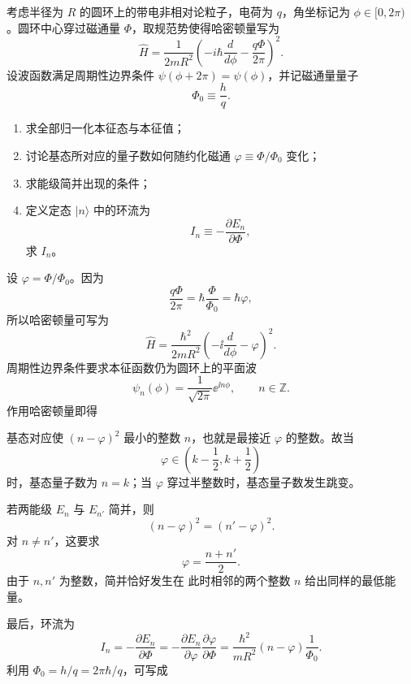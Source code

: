 ﻿

\begin{question}
考虑半径为 $R$ 的圆环上的带电非相对论粒子，电荷为 $q$，角坐标记为 $\phi\in[0,2\pi)$。圆环中心穿过磁通量 $\Phi$，取规范势使得哈密顿量写为
\[
\hat H=\frac{1}{2mR^2}\left(-i\hbar\frac{d}{d\phi}-\frac{q\Phi}{2\pi}\right)^2.
\]
设波函数满足周期性边界条件 $\psi(\phi+2\pi)=\psi(\phi)$，并记磁通量量子
\[
\Phi_0\equiv \frac{h}{q}.
\]

\begin{enumerate}[label=(\arabic*),leftmargin=2.5em]
  \item 求全部归一化本征态与本征值；
  \item 讨论基态所对应的量子数如何随约化磁通 $\varphi\equiv \Phi/\Phi_0$ 变化；
  \item 求能级简并出现的条件；
  \item 定义定态 $|n\rangle$ 中的环流为
  \[
  I_n\equiv -\frac{\partial E_n}{\partial \Phi},
  \]
  求 $I_n$。
\end{enumerate}

\begin{solution}
设 $\varphi=\Phi/\Phi_0$。因为
\[
\frac{q\Phi}{2\pi}=\hbar\frac{\Phi}{\Phi_0}=\hbar\varphi,
\]
所以哈密顿量可写为
\[
\hat H=\frac{\hbar^2}{2mR^2}\left(-\ii\frac{d}{d\phi}-\varphi\right)^2.
\]
周期性边界条件要求本征函数仍为圆环上的平面波
\[
\psi_n(\phi)=\frac{1}{\sqrt{2\pi}}\ee^{\ii n\phi},\qquad n\in\mathbb Z.
\]
作用哈密顿量即得

基态对应使 $(n-\varphi)^2$ 最小的整数 $n$，也就是最接近 $\varphi$ 的整数。故当
\[
\varphi\in\left(k-\frac12,k+\frac12\right)
\]
时，基态量子数为 $n=k$；当 $\varphi$ 穿过半整数时，基态量子数发生跳变。

若两能级 $E_n$ 与 $E_{n'}$ 简并，则
\[
(n-\varphi)^2=(n'-\varphi)^2.
\]
对 $n\neq n'$，这要求
\[
\varphi=\frac{n+n'}{2}.
\]
由于 $n,n'$ 为整数，简并恰好发生在
此时相邻的两个整数 $n$ 给出同样的最低能量。

最后，环流为
\[
I_n=-\frac{\partial E_n}{\partial \Phi}
=-\frac{\partial E_n}{\partial \varphi}\frac{\partial \varphi}{\partial \Phi}
=\frac{\hbar^2}{mR^2}(n-\varphi)\frac{1}{\Phi_0}.
\]
利用 $\Phi_0=h/q=2\pi\hbar/q$，可写成
\end{solution}
\end{question}

